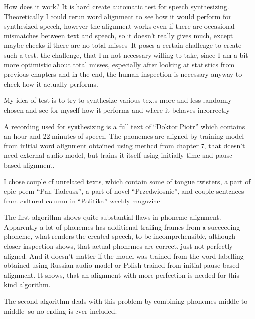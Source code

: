 \documentclass[12pt,a4paper,english]{article}
\begin{document}
How does it work? It is hard create automatic test for speech synthesizing. Theoretically I could rerun word alignment to see how it would perform for synthesized speech, however the alignment works even if there are occasional mismatches between text and speech, so it doesn't really gives much, except maybe checks if there are no total misses. It poses a certain challenge to create such a test, the challenge, that I'm not necessary willing to take, since I am a bit more optimistic about total misses, especially after looking at statistics from previous chapters and in the end, the human inspection is necessary anyway to check how it actually performs. \newline

My idea of test is to try to synthesize various texts more and less randomly chosen and see for myself how it performs and where it behaves incorrectly. \newline

A recording used for synthesizing is a full text of “Doktor Piotr” which contains an hour and 22 minutes of speech. The phonemes are aligned by training model from initial word alignment obtained using method from chapter 7, that doesn't need external audio model, but trains it itself using initially time and pause based alignment. \newline

I chose couple of unrelated texts, which contain some of tongue twisters, a part of epic poem “Pan Tadeusz”, a part of novel “Przedwiosnie”, and couple sentences from cultural column in “Politika” weekly magazine. \newline
\newline

The first algorithm shows quite substantial flaws in phoneme alignment. Apparently a lot of phonemes has additional trailing frames from a succeeding phoneme, what renders the created speech, to be incomprehensible, although closer inspection shows, that actual phonemes are correct, just not perfectly aligned. And it doesn't matter if the model was trained from the word labelling obtained using Russian audio model or Polish trained from initial pause based alignment. It shows, that an alignment with more perfection is needed for this kind algorithm. \newline

The second algorithm deals with this problem by combining phonemes middle to middle, so no ending is ever included. 
\end{document}
